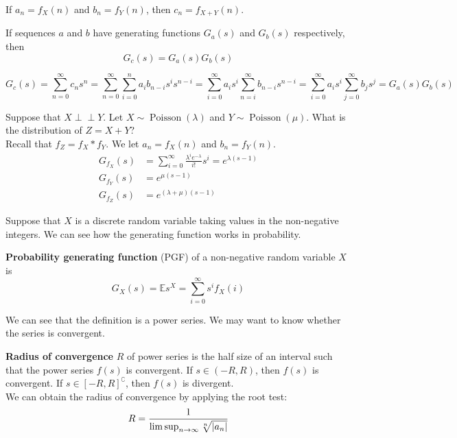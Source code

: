 \documentclass{huhtakm-template-book}
\newcommand{\independent}{\perp\!\!\!\perp}
\newcommand{\expect}{\mathbb{E}}
\DeclareMathOperator{\Poisson}{Poisson}
\begin{document}
    \begin{eg}
        If $a_{n}=f_{X}(n)$ and $b_{n}=f_{Y}(n)$, then $c_{n}=f_{X+Y}(n)$.
    \end{eg}
    \begin{cla}
        If sequences $a$ and $b$ have generating functions $G_{a}(s)$ and $G_{b}(s)$ respectively, then
        \begin{equation*}
            G_{c}(s)=G_{a}(s)G_{b}(s)
        \end{equation*}
    \end{cla}
    \begin{proofing}
        \begin{equation*}
            G_{c}(s)=\sum_{n=0}^{\infty}c_{n}s^{n}=\sum_{n=0}^{\infty}\sum_{i=0}^{n}a_{i}b_{n-i}s^{i}s^{n-i}=\sum_{i=0}^{\infty}a_{i}s^{i}\sum_{n=i}^{\infty}b_{n-i}s^{n-i}=\sum_{i=0}^{\infty}a_{i}s^{i}\sum_{j=0}^{\infty}b_{j}s^{j}=G_{a}(s)G_{b}(s)
        \end{equation*}
    \end{proofing}
    \begin{eg}
        \label{Two independent poisson PGF}
        Suppose that $X\independent Y$. Let $X\sim\Poisson(\lambda)$ and $Y\sim\Poisson(\mu)$. What is the distribution of $Z=X+Y$?\\
        Recall that $f_{Z}=f_{X}*f_{Y}$. We let $a_{n}=f_{X}(n)$ and $b_{n}=f_{Y}(n)$.
        \begin{align*}
            G_{f_{X}}(s)&=\sum_{i=0}^{\infty}\frac{\lambda^{i}e^{-\lambda}}{i!}s^{i}=e^{\lambda(s-1)}\\
            G_{f_{Y}}(s)&=e^{\mu(s-1)}\\
            G_{f_{Z}}(s)&=e^{(\lambda+\mu)(s-1)}
        \end{align*}
    \end{eg}
    Suppose that $X$ is a discrete random variable taking values in the non-negative integers. We can see how the generating function works in probability.
    \begin{defn}
        \textbf{Probability generating function} (PGF) of a non-negative random variable $X$ is
        \begin{equation*}
            G_{X}(s)=\expect s^{X}=\sum_{i=0}^{\infty}s^{i}f_{X}(i)
        \end{equation*}
    \end{defn}
    We can see that the definition is a power series. We may want to know whether the series is convergent.
    \begin{defn}
        \textbf{Radius of convergence} $R$ of power series is the half size of an interval such that the power series $f(s)$ is convergent. If $s\in(-R,R)$, then $f(s)$ is convergent. If $s\in[-R,R]^{\complement}$, then $f(s)$ is divergent.\\
        We can obtain the radius of convergence by applying the root test:
        \begin{equation*}
            R=\frac{1}{\limsup_{n\to\infty}\sqrt[n]{\left|{a_{n}}\right|}}
        \end{equation*}
    \end{defn}
\end{document}
